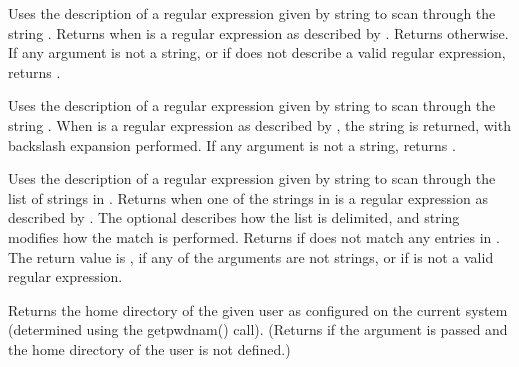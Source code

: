 \begin{description}
  \item[\Code{Boolean regexp(String pattern, String target \Lbr\ , String options \Rbr)}]
    Uses the description of a regular expression 
    given by string 
    to scan through the string .
    Returns  when  is 
    a regular expression as described by .
    Returns  otherwise.
    If any argument is not a string, or if  does not describe
    a valid regular expression, returns .

  \item[\Code{String regexps}]  
    Uses the description of a regular expression 
    given by string 
    to scan through the string .
    When  is a regular expression
    as described by ,
    the string  is returned,
    with backslash expansion performed.
    If any argument is not a string, returns .

  \item[\Code{Boolean stringList\_regexpMember}]
    Uses the description of a regular expression 
    given by string 
    to scan through the list of strings in .
    Returns  when one of the strings in  is 
    a regular expression as described by .
    The optional  describes how the list is delimited,
    and string  modifies how the match is performed.
    Returns  if  does not match any entries in
    .
    The return value is , if any of the arguments
    are not strings, or if  is not a valid regular expression.

  \item[\Code{String userHome(String userName \Lbr\ , String default \Rbr)}]
    Returns the home directory of the given user as configured on the
    current system (determined using the getpwdnam() call).  (Returns
     if the  argument is passed and the
    home directory of the user is not defined.)


\end{description}
